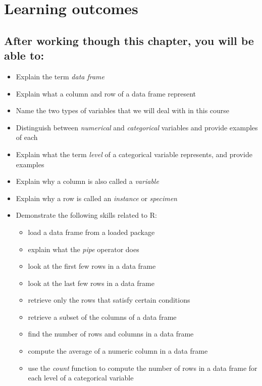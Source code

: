 \documentclass[
  12pt,
  letterpaper,
  DIV=11,
  numbers=noendperiod]{scrreprt}
\providecommand{\tightlist}{%
  \setlength{\itemsep}{0pt}\setlength{\parskip}{0pt}}
\begin{document}
\section*{Learning outcomes}\label{learning-outcomes}


\subsection*{After working though this chapter, you will be able
to:}\label{after-working-though-this-chapter-you-will-be-able-to}

\begin{itemize}
\tightlist
\item
  Explain the term \emph{data frame}
\item
  Explain what a column and row of a data frame represent
\item
  Name the two types of variables that we will deal with in this course
\item
  Distinguish between \emph{numerical} and \emph{categorical} variables
  and provide examples of each
\item
  Explain what the term \emph{level} of a categorical variable
  represents, and provide examples
\item
  Explain why a column is also called a \emph{variable}
\item
  Explain why a row is called an \emph{instance} or \emph{specimen}
\item
  Demonstrate the following skills related to R:

  \begin{itemize}
  \tightlist
  \item
    load a data frame from a loaded package
  \item
    explain what the \emph{pipe} operator does
  \item
    look at the first few rows in a data frame
  \item
    look at the last few rows in a data frame
  \item
    retrieve only the rows that satisfy certain conditions
  \item
    retrieve a subset of the columns of a data frame
  \item
    find the number of rows and columns in a data frame
  \item
    compute the average of a numeric column in a data frame
  \item
    use the \emph{count} function to compute the number of rows in a
    data frame for each level of a categorical variable
  \end{itemize}
\end{itemize}
\end{document}
